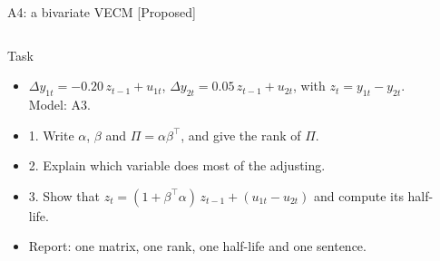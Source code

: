 \begin{frame}{A4: a bivariate VECM [Proposed]}
\propsub
\itemsize{\scriptsize}
\begin{columns}[T]
\begin{column}{\taskw}
\begin{block}{Task}
\begin{itemize}
    \item $\Delta y_{1t} = -0.20\,z_{t-1} + u_{1t}$, $\Delta y_{2t} = 0.05\,z_{t-1} + u_{2t}$, with $z_t = y_{1t} - y_{2t}$. Model: A3.
    \item 1. Write $\alpha$, $\beta$ and $\Pi = \alpha\beta^\top$, and give the rank of $\Pi$.
    \item 2. Explain which variable does most of the adjusting.
    \item 3. Show that $z_t = (1 + \beta^\top\alpha)\,z_{t-1} + (u_{1t} - u_{2t})$ and compute its half-life.
    \item Report: one matrix, one rank, one half-life and one sentence.
\end{itemize}
\end{block}
\end{column}
\begin{column}{\solw}
\end{column}
\end{columns}
\end{frame}

